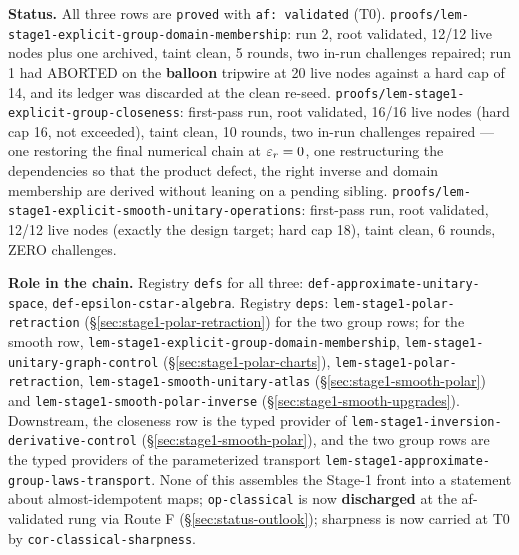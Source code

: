 \medskip
\noindent\textbf{Status.} All three rows are \texttt{proved} with \texttt{af: validated}
(T0). \texttt{proofs/lem-stage1-explicit-group-domain-membership}: run 2, root validated,
12/12 live nodes plus one archived, taint clean, 5 rounds, two in-run challenges repaired;
run 1 had ABORTED on the \textbf{balloon} tripwire at 20 live nodes against a hard cap of
14, and its ledger was discarded at the clean re-seed.
\texttt{proofs/lem-stage1-explicit-group-closeness}: first-pass run, root validated, 16/16
live nodes (hard cap 16, not exceeded), taint clean, 10 rounds, two in-run challenges
repaired --- one restoring the final numerical chain at $\varepsilon_r=0$, one restructuring the
dependencies so that the product defect, the right inverse and domain membership are derived
without leaning on a pending sibling. \texttt{proofs/lem-stage1-explicit-smooth-unitary-operations}:
first-pass run, root validated, 12/12 live nodes (exactly the design target; hard cap 18),
taint clean, 6 rounds, ZERO challenges.

\noindent\textbf{Role in the chain.} Registry \texttt{defs} for all three:
\texttt{def-approximate-unitary-space}, \texttt{def-epsilon-cstar-algebra}. Registry
\texttt{deps}: \texttt{lem-stage1-polar-retraction}
(\S\ref{sec:stage1-polar-retraction}) for the two group rows; for the smooth row,
\texttt{lem-stage1-explicit-group-domain-membership},
\texttt{lem-stage1-unitary-graph-control} (\S\ref{sec:stage1-polar-charts}),
\texttt{lem-stage1-polar-retraction}, \texttt{lem-stage1-smooth-unitary-atlas}
(\S\ref{sec:stage1-smooth-polar}) and \texttt{lem-stage1-smooth-polar-inverse}
(\S\ref{sec:stage1-smooth-upgrades}). Downstream, the closeness row is the typed provider of
\texttt{lem-stage1-inversion-derivative-control} (\S\ref{sec:stage1-smooth-polar}), and the
two group rows are the typed providers of the parameterized transport
\texttt{lem-stage1-approximate-group-laws-transport}. None of this assembles the Stage-1
front into a statement about almost-idempotent maps; \texttt{op-classical} is now \textbf{discharged} at the af-validated rung via Route F (\S\ref{sec:status-outlook}); sharpness is now carried at T0 by \texttt{cor-classical-sharpness}.
